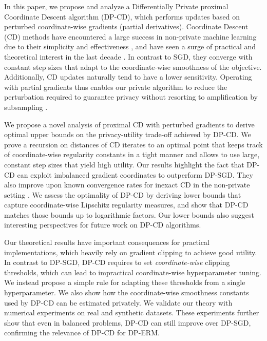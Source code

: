 In this paper, we propose and analyze a Differentially Private proximal
Coordinate
Descent algorithm (DP-CD), which performs updates based on perturbed
coordinate-wise gradients (\ie partial derivatives).  Coordinate
Descent (CD) methods have encountered a large success in non-private
machine learning due to their simplicity and effectiveness
\citep{liu2009Blockwise,friedman2010Regularization,chang2008Coordinate,sardy2000Block},
and have seen a surge of practical and theoretical interest in the
last decade \citep{Nesterov12,wright2015Coordinate,shi2017Primer,
  richtarik2014Iteration,fercoq2014Accelerated,tappenden2016Inexact,
  hanzely2020Variance,nutini2015Coordinate,karimireddy2019Efficient}.
In contrast to SGD, they converge with constant step sizes that adapt to
the coordinate-wise smoothness of
the objective. Additionally, CD updates naturally tend to
have a lower sensitivity. Operating with partial gradients thus enables
our private algorithm to reduce the perturbation required to
guarantee privacy without resorting to
amplification by
subsampling \citep{Balle_subsampling,mironov2019Enyi}.


We propose a novel analysis of proximal CD with perturbed gradients to
derive optimal upper bounds on the privacy-utility trade-off achieved
by DP-CD.
We prove a
recursion on distances of CD iterates to an optimal point that keeps track of
coordinate-wise regularity
constants in a tight manner and allows to use
large, constant step sizes that
yield high utility. Our results highlight the fact that DP-CD
can exploit imbalanced gradient coordinates to outperform DP-SGD.
They also improve upon known convergence rates for inexact CD in the
non-private setting
\citep{tappenden2016Inexact}.
We assess the optimality of DP-CD by deriving lower bounds
that capture coordinate-wise Lipschitz regularity measures, and show that
DP-CD matches those bounds up to logarithmic factors.
Our lower bounds also suggest interesting perspectives for future work on
DP-CD algorithms.

Our theoretical results
have important consequences for practical
implementations, which heavily rely on gradient clipping to achieve good
utility.
In contrast to DP-SGD, DP-CD requires to set \emph{coordinate-wise} clipping
thresholds, which can lead to impractical coordinate-wise hyperparameter tuning.
We instead propose a simple rule for adapting these thresholds from a
single hyperparameter. We also show how the coordinate-wise smoothness
constants used by DP-CD can be
estimated privately. We validate our theory with numerical
experiments on real and synthetic datasets. These experiments further
show that even in balanced problems, DP-CD can still improve over
DP-SGD, confirming the relevance of DP-CD for DP-ERM.

